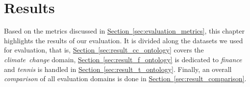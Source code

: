 \chapter{Results}\label{chap:results}
Based on the metrics discussed in \hyperref[sec:evaluation_metrics]{Section~\ref*{sec:evaluation_metrics}}, this chapter highlights the results of our evaluation.
It is divided along the datasets we used for evaluation, that is, \hyperref[sec:result_cc_ontology]{Section~\ref*{sec:result_cc_ontology}} covers the \emph{climate~change} domain, \hyperref[sec:result_f_ontology]{Section~\ref*{sec:result_f_ontology}} is dedicated to \emph{finance} and \emph{tennis} is handled in \hyperref[sec:result_t_ontology]{Section~\ref*{sec:result_t_ontology}}. Finally, an overall \emph{comparison} of all evaluation domains is done in \hyperref[sec:result_comparison]{Section~\ref*{sec:result_comparison}}.












